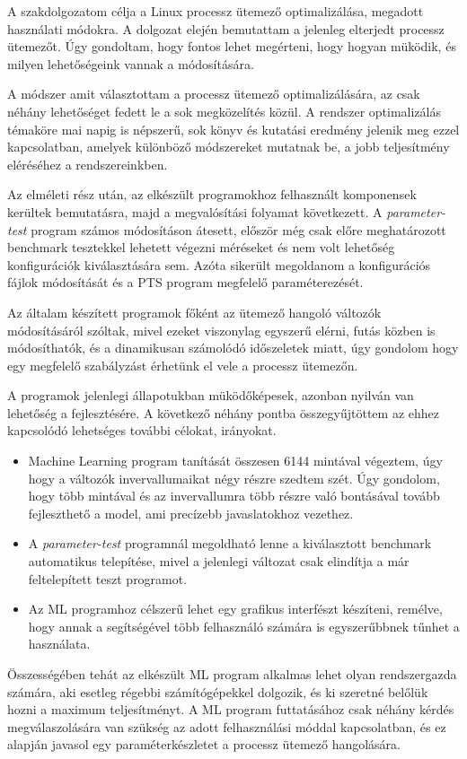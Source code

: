 
A szakdolgozatom célja a Linux processz ütemező optimalizálása, megadott használati módokra.
A dolgozat elején bemutattam a jelenleg elterjedt processz ütemezőt. Úgy gondoltam, hogy fontos lehet megérteni, hogy hogyan müködik, és milyen lehetőségeink vannak a módosítására.

A módszer amit választottam a processz ütemező optimalizálására, az csak néhány lehetőséget fedett le a sok megközelítés közül. A rendszer optimalizálás témaköre mai napig is népszerű, sok könyv és kutatási eredmény jelenik meg ezzel kapcsolatban, amelyek különböző módszereket mutatnak be, a jobb teljesítmény eléréséhez a rendszereinkben.

Az elméleti rész után, az elkészült programokhoz felhasznált komponensek kerültek bemutatásra, majd a megvalósítási folyamat következett. A \textit{parameter-test} program számos módosításon átesett, először még csak előre meghatározott benchmark tesztekkel lehetett végezni méréseket és nem volt lehetőség konfigurációk kiválasztására sem. Azóta sikerült megoldanom a konfigurációs fájlok módosítását és a PTS program megfelelő paraméterezését. 

Az általam készített programok főként az ütemező hangoló változók módosításáról szóltak, mivel ezeket viszonylag egyszerű elérni, futás közben is módosíthatók, és a dinamikusan számolódó időszeletek miatt, úgy gondolom hogy egy megfelelő szabályzást érhetünk el vele a processz ütemezőn.

A programok jelenlegi állapotukban müködőképesek, azonban nyilván van lehetőség a fejlesztésére. A következő néhány pontba összegyűjtöttem az ehhez kapcsolódó lehetséges további célokat, irányokat.
\begin{itemize}
\item Machine Learning program tanítását összesen 6144 mintával végeztem, úgy hogy a változók invervallumaikat négy részre szedtem szét. Úgy gondolom, hogy több mintával és az invervallumra több részre való bontásával tovább fejleszthető a model, ami precízebb javaslatokhoz vezethez.
\item A \textit{parameter-test} programnál megoldható lenne a kiválasztott benchmark automatikus telepítése, mivel a jelenlegi változat csak elindítja a már feltelepített teszt programot.
\item Az ML programhoz célszerű lehet egy grafikus interfészt készíteni, remélve, hogy annak a segítségével több felhasználó számára  is egyszerűbbnek tűnhet a használata.
\end{itemize}

Összességében tehát az elkészült ML program alkalmas lehet olyan rendszergazda számára, aki esetleg régebbi számítógépekkel dolgozik, és ki szeretné belőlük hozni a maximum teljesítményt.
A ML program futtatásához csak néhány kérdés megválaszolására van szükség az adott felhasználási móddal kapcsolatban, és ez alapján javasol egy paraméterkészletet a processz ütemező hangolására.

